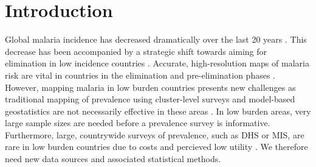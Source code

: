 \documentclass[10pt,letterpaper]{article}
\begin{document}
\linenumbers

\section*{Introduction}



Global malaria incidence has decreased dramatically over the last 20 years \cite{abajobir2017global, bhatt2015effect}.
This decrease has been accompanied by a strategic shift towards aiming for elimination in low incidence countries \cite{world2016world, newby2016path}.
Accurate, high-resolution maps of malaria risk are vital in countries in the elimination and pre-elimination phases \cite{sturrock2016mapping, cohen2017mapping}.
However, mapping malaria in low burden countries presents new challenges as traditional mapping of prevalence \cite{gething2011new, bhatt2017improved, gething2012long} using cluster-level surveys and model-based geostatistics are not necessarily effective in these areas \cite {sturrock2016mapping, sturrock2014fine}.
In low burden areas, very large sample sizes are needed before a prevalence survey is informative.
Furthermore, large, countrywide surveys of prevalence, such as DHS or MIS, are rare in low burden countries due to costs and percieved low utility \cite{dhs}.
We therefore need new data sources and associated statistical methods.


\end{document}

